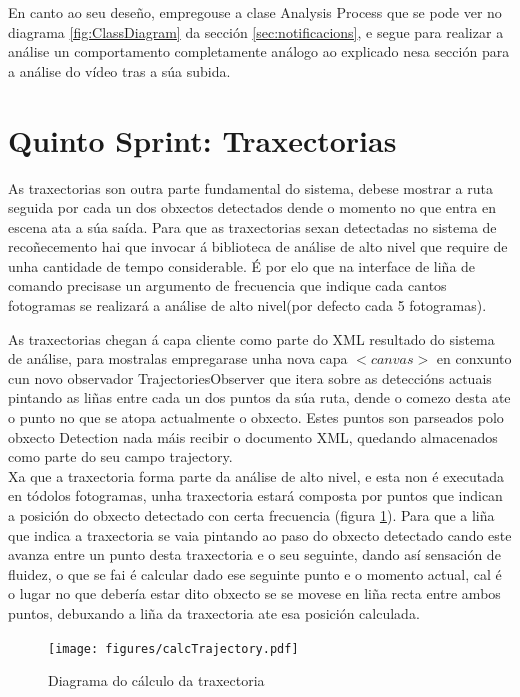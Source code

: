         En canto ao seu deseño, empregouse a clase Analysis Process que se pode ver no diagrama 
        \ref{fig:ClassDiagram} da sección \ref{sec:notificacions}, e segue para realizar a análise
        un comportamento completamente análogo ao explicado nesa sección para a análise do vídeo 
        tras a súa subida.
        
\section{Quinto Sprint: Traxectorias}
    
    As traxectorias son outra parte fundamental do sistema, debese mostrar a ruta seguida por 
    cada un dos obxectos detectados dende o momento no que entra en escena ata a súa saída. Para 
    que as traxectorias sexan detectadas no sistema de recoñecemento hai que invocar á biblioteca 
    de análise de alto nivel que require de unha cantidade de tempo considerable. É por elo que na 
    interface de liña de comando precisase un argumento de frecuencia que indique cada cantos 
    fotogramas se realizará a análise de alto nivel(por defecto cada 5 fotogramas).
    
    As traxectorias chegan á capa cliente como parte do XML resultado do sistema de análise, para 
    mostralas empregarase unha nova capa $<canvas>$ en conxunto cun novo observador 
    TrajectoriesObserver que itera sobre as deteccións actuais pintando as liñas entre cada un dos
    puntos da súa ruta, dende o comezo desta ate o punto no que se atopa actualmente o obxecto. 
    Estes puntos son parseados polo obxecto Detection nada máis recibir o documento XML, quedando
    almacenados como parte do seu campo trajectory.\\
    
    Xa que a traxectoria forma parte da análise de alto nivel, e esta 
    non é executada en tódolos fotogramas, unha traxectoria estará composta por puntos que indican a
    posición do obxecto detectado con certa frecuencia (figura \ref{fig:calcTrajectory}).
    Para que a liña que indica a traxectoria se vaia pintando ao paso do obxecto detectado cando
    este avanza entre un punto desta traxectoria e o seu seguinte, dando así sensación de fluidez, 
    o que se fai é calcular dado ese seguinte punto e o momento actual, cal é o lugar no que debería
    estar dito obxecto se se movese en liña recta entre ambos puntos, debuxando a liña da 
    traxectoria ate esa posición calculada.
    
    \begin{figure}[htp]
    \begin{center}
        \texttt{[image: figures/calcTrajectory.pdf]}
        \caption{Diagrama do cálculo da traxectoria}
    \label{fig:calcTrajectory}
    \end{center}
    \end{figure}
    
